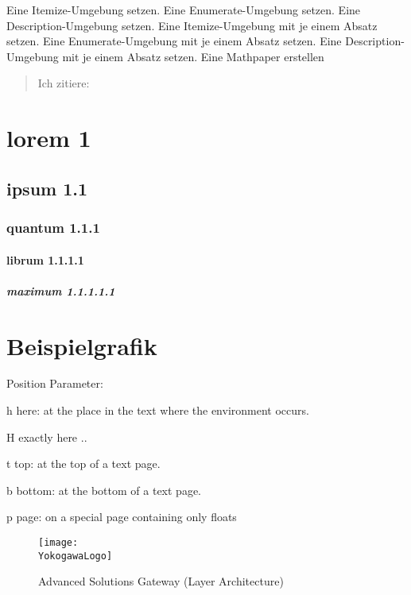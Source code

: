     Eine Itemize-Umgebung setzen.
\blinditemize
    Eine Enumerate-Umgebung setzen.
\blindenumerate
    Eine Description-Umgebung setzen.
\blinddescription
    Eine Itemize-Umgebung mit je einem Absatz setzen.
\Blinditemize
    Eine Enumerate-Umgebung mit je einem Absatz setzen.
\Blindenumerate
    Eine Description-Umgebung mit je einem Absatz setzen.
\Blinddescription
    Eine Mathpaper erstellen

\blindmathpaper


\begin{quote}
Ich zitiere:
\small
\it
\blindtext
\end{quote}


\section{       lorem 1}  \label{PAGE_blabla}
\blindtext
\subsection{    ipsum 1.1}
\blindtext
\subsubsection{ quantum 1.1.1}
\blindtext
\paragraph{     librum 1.1.1.1}
\blindtext
\subparagraph{  maximum 1.1.1.1.1}
\blindtext

\newpage

\section{Beispielgrafik}
Position Parameter:

h here: at the place in the text where the environment occurs.

H exactly here ..

t top: at the top of a text page.

b bottom: at the bottom of a text page.

p page: on a special page containing only floats

    \begin{figure}[htp]  %
      \begin{center}
        \texttt{[image: \\YokogawaLogo]}
        \caption{Advanced Solutions Gateway (Layer Architecture)}
        \label{PIC_ADV_SOL_LAYERS}
      \end{center}
    \end{figure}

